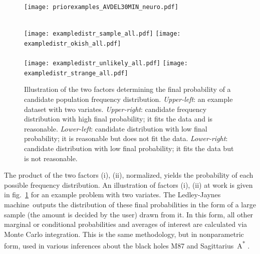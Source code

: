 \documentclass[utf8]{FrontiersinHarvard} %
\newcommand*{\fig}{fig.}%
\renewcommand*{\|}[1][]{\nonscript\:#1\vert\nonscript\:\mathopen{}}
\newcommand*{\ravltdel}{\texttt{RAVLT-del}}
\newcommand*{\ravltrec}{\texttt{RAVLT-rec}}
\newcommand*{\ljm}{Ledley-Jaynes machine}
\begin{document}
\begin{subfigure}[t]\setcounter{subfigure}{0}
  \centering%
  \begin{minipage}[c]{0.39\linewidth}\centering
    \texttt{[image: priorexamples\_AVDEL30MIN\_neuro.pdf]}
  \caption{Samples of initially probable candidates of the true population frequency distribution, for a variate such as \ravltdel\ %
    or \ravltrec. %
    }\label{fig:prior_distribution}
  \end{minipage}\hfill
  \begin{minipage}[c]{0.59\linewidth}\centering%
%
\hfill%
%
\\[-1em]
\texttt{[image: exampledistr\_sample\_all.pdf]}%
\hfill%
\texttt{[image: exampledistr\_okish\_all.pdf]}%
\\
%
\hfill%
%
\\[-1em]
  \texttt{[image: exampledistr\_unlikely\_all.pdf]}
  \hfill
  \texttt{[image: exampledistr\_strange\_all.pdf]}
  \caption{Illustration of the two factors determining the final probability of a candidate population frequency distribution. \emph{Upper-left}: an example dataset with two variates. \emph{Upper-right}: candidate frequency distribution with high final probability; it fits the data and is reasonable. \emph{Lower-left}: candidate distribution with low final probability; it is reasonable but does not fit the data. \emph{Lower-right}: candidate distribution with low final probability; it fits the data but is not reasonable.}\label{fig:inferring_distribution}
  \end{minipage}
\end{subfigure}%


The product of the two factors (i), (ii), normalized, yields the probability of each possible frequency distribution. An illustration of factors (i), (ii) at work is given in \fig~\ref{fig:inferring_distribution} for an example problem with two variates. The \ljm\ outputs the distribution of these final probabilities in the form of a large sample (the amount is decided by the user) drawn from it. In this form, all other marginal or conditional probabilities and averages of interest are calculated via Monte Carlo integration. This is the same methodology, but in nonparametric form, used in various inferences about the black holes M87 and Sagittarius~A\textsuperscript{*} \citep{eht2019,eht2022}.
\end{document}
